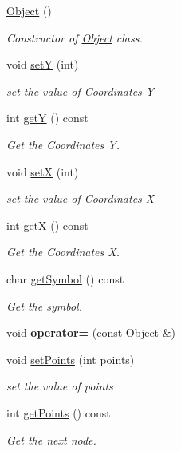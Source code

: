 \begin{DoxyCompactItemize}
\item 
\hyperlink{class_object_a40860402e64d8008fb42329df7097cdb}{Object} ()
\begin{DoxyCompactList}\small\item\em Constructor of \hyperlink{class_object}{Object} class. \end{DoxyCompactList}\item 
void \hyperlink{class_object_a9b3c3653717b0540dfa783bf666abf63}{setY} (int)
\begin{DoxyCompactList}\small\item\em set the value of Coordinates Y \end{DoxyCompactList}\item 
int \hyperlink{class_object_a81accadc2226d0e6c41c09dccc7a5f5e}{getY} () const
\begin{DoxyCompactList}\small\item\em Get the Coordinates Y. \end{DoxyCompactList}\item 
void \hyperlink{class_object_ad62efaa642d05c8b54b4427c23803398}{setX} (int)
\begin{DoxyCompactList}\small\item\em set the value of Coordinates X \end{DoxyCompactList}\item 
int \hyperlink{class_object_a66bac5f818d4d7c05aa457e246e4ca7b}{getX} () const
\begin{DoxyCompactList}\small\item\em Get the Coordinates X. \end{DoxyCompactList}\item 
char \hyperlink{class_object_a78ae01107b8544f5c4590afb90f38258}{get\+Symbol} () const
\begin{DoxyCompactList}\small\item\em Get the symbol. \end{DoxyCompactList}\item 
\mbox{\label{class_object_a3003c5556506521b805e013f90e0d740}} 
void {\bfseries operator=} (const \hyperlink{class_object}{Object} \&)
\item 
void \hyperlink{class_object_a6ad44e8d6238a0246882864be6c83e8e}{set\+Points} (int points)
\begin{DoxyCompactList}\small\item\em set the value of points \end{DoxyCompactList}\item 
int \hyperlink{class_object_a555148cd05b5b98d4d18b4cc5dc06a37}{get\+Points} () const
\begin{DoxyCompactList}\small\item\em Get the next node. \end{DoxyCompactList}\end{DoxyCompactItemize}
